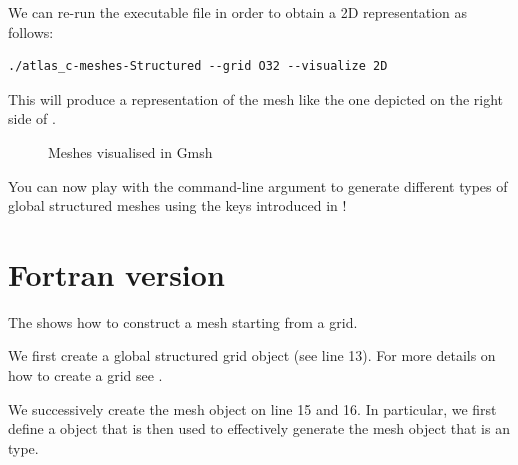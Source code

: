 We can re-run the executable file in order to obtain 
a 2D representation as follows:
%
\begin{lstlisting}[style=BashStyle]
./atlas_c-meshes-Structured --grid O32 --visualize 2D
\end{lstlisting}
% 
This will produce a representation of the mesh like 
the one depicted on the right side of .
%
\begin{figure}%
\centering
{}\qquad\qquad\qquad
{}
\caption{Meshes visualised in Gmsh}%
\label{fig:meshes}%
\end{figure}
%
You can now play with the command-line argument to generate 
different types of global structured meshes using the keys 
introduced in !




\section{Fortran version}
The  shows how to construct a mesh 
starting from a grid.
%

%
We first create 
a global structured grid object (see line 13). For more 
details on how to create a grid see .

We successively create the mesh object on line 15 and 16.
In particular, we first define a  
object that is then used to effectively generate the mesh object 
 that is an  type.

